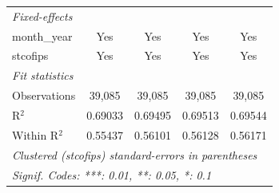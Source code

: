 \begin{tabular}{lcccc}
   \midrule
   \emph{Fixed-effects}\\
   month\_year                   & Yes            & Yes            & Yes            & Yes\\  
   stcofips                      & Yes            & Yes            & Yes            & Yes\\  
   \midrule
   \emph{Fit statistics}\\
   Observations                  & 39,085         & 39,085         & 39,085         & 39,085\\  
   R$^2$                         & 0.69033        & 0.69495        & 0.69513        & 0.69544\\  
   Within R$^2$                  & 0.55437        & 0.56101        & 0.56128        & 0.56171\\  
   \midrule \midrule
   \multicolumn{5}{l}{\emph{Clustered (stcofips) standard-errors in parentheses}}\\
   \multicolumn{5}{l}{\emph{Signif. Codes: ***: 0.01, **: 0.05, *: 0.1}}\\
\end{tabular}
\par\endgroup


